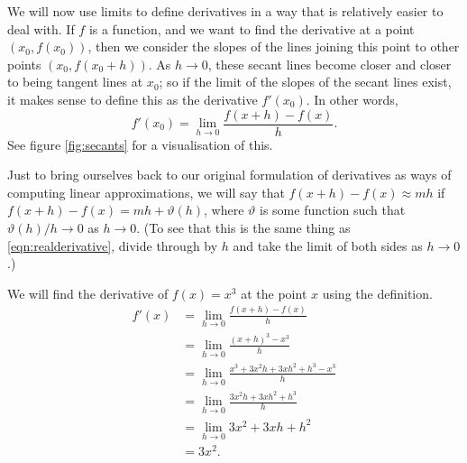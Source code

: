 We will now use limits to define derivatives in a way that is relatively easier to deal with. If $ f $ is a function,
and we want to find the derivative at a point $ (x_0, f(x_0)) $, then we consider the slopes of the lines joining
this point to other points $ (x_0, f(x_0 + h)) $. As $ h \to 0 $, these secant lines become closer and closer to being
tangent lines at $ x_0 $; so if the limit of the slopes of the secant lines exist, it makes sense to define this as
the derivative $ f'(x_0) $. In other words,
\begin{equation}\label{eqn:realderivative}
  f'(x_0) = \lim_{h \to 0} \frac{f(x + h) - f(x)}{h}.
\end{equation}
See figure \ref{fig:secants} for a visualisation of this.

Just to bring ourselves back to our original formulation of derivatives as ways of computing linear
approximations, we will say that $ f(x + h) - f(x) \approx mh $ if $ f(x + h) - f(x) = mh + \vartheta(h) $,
where $ \vartheta $ is some function such that $ \vartheta(h)/h \to 0 $ as $ h \to 0 $. (To see that
this is the same thing as \ref{eqn:realderivative}, divide through by $ h $ and take the limit of both
sides as $ h \to 0 $.)

\begin{ex}
  We will find the derivative of $ f(x) = x^3 $ at the point $ x $ using the definition.
  \begin{align*}
    f'(x) &= \lim_{h \to 0} \frac{f(x + h) - f(x)}{h}\\
          &= \lim_{h \to 0} \frac{(x + h)^3 - x^3}{h}\\
          &= \lim_{h \to 0} \frac{x^3 + 3x^2h + 3xh^2 + h^3 - x^3}{h}\\
          &= \lim_{h \to 0} \frac{3x^2 h + 3xh^2 + h^3}{h}\\
          &= \lim_{h \to 0} 3x^2 + 3xh + h^2\\
          &= 3x^2.
  \end{align*}
\end{ex}


